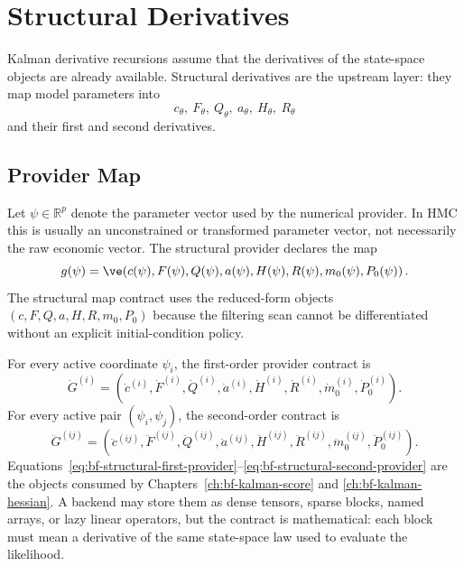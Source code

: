 \chapter{Structural Derivatives}
\label{ch:bf-structural-derivatives}

Kalman derivative recursions assume that the derivatives of the state-space
objects are already available.  Structural derivatives are the upstream layer:
they map model parameters into
\[
  c_\theta,\ F_\theta,\ Q_\theta,\ a_\theta,\ H_\theta,\ R_\theta
\]
and their first and second derivatives.

\section{Provider Map}
\label{sec:bf-structural-provider-map}

Let $\psi\in\mathbb{R}^p$ denote the parameter vector used by the numerical
provider.  In HMC this is usually an unconstrained or transformed parameter
vector, not necessarily the raw economic vector.  The structural provider
declares the map
\begin{equation}
\label{eq:bf-structural-map}
  g(\psi)
  =
  \ve\!\left(
    c(\psi),F(\psi),Q(\psi),a(\psi),H(\psi),R(\psi),
    m_0(\psi),P_0(\psi)
  \right).
\end{equation}
The structural map contract uses the reduced-form objects
$(c,F,Q,a,H,R,m_0,P_0)$ because the filtering scan cannot be differentiated
without an explicit initial-condition policy.

For every active coordinate $\psi_i$, the first-order provider contract is
\begin{equation}
\label{eq:bf-structural-first-provider}
  \dot G^{(i)}
  =
  \left(
    \dot c^{(i)},\dot F^{(i)},\dot Q^{(i)},
    \dot a^{(i)},\dot H^{(i)},\dot R^{(i)},
    \dot m_0^{(i)},\dot P_0^{(i)}
  \right).
\end{equation}
For every active pair $(\psi_i,\psi_j)$, the second-order contract is
\begin{equation}
\label{eq:bf-structural-second-provider}
  \ddot G^{(ij)}
  =
  \left(
    \ddot c^{(ij)},\ddot F^{(ij)},\ddot Q^{(ij)},
    \ddot a^{(ij)},\ddot H^{(ij)},\ddot R^{(ij)},
    \ddot m_0^{(ij)},\ddot P_0^{(ij)}
  \right).
\end{equation}
Equations~\eqref{eq:bf-structural-first-provider}--\eqref{eq:bf-structural-second-provider}
are the objects consumed by Chapters~\ref{ch:bf-kalman-score} and
\ref{ch:bf-kalman-hessian}.  A backend may store them as dense tensors, sparse
blocks, named arrays, or lazy linear operators, but the contract is mathematical:
each block must mean a derivative of the same state-space law used to evaluate
the likelihood.

